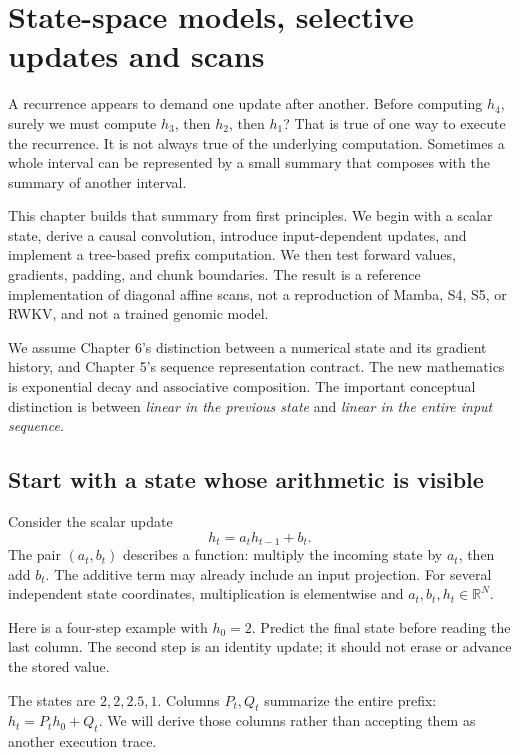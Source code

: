 \chapter{State-space models, selective updates and scans}

A recurrence appears to demand one update after another. Before computing
$h_4$, surely we must compute $h_3$, then $h_2$, then $h_1$?
That is true of one way to execute the recurrence. It is not always true
of the underlying computation. Sometimes a whole interval can be
represented by a small summary that composes with the summary of another
interval.

This chapter builds that summary from first principles. We begin with a
scalar state, derive a causal convolution, introduce input-dependent
updates, and implement a tree-based prefix computation. We then test
forward values, gradients, padding, and chunk boundaries. The result is
a reference implementation of diagonal affine scans, not a reproduction
of Mamba, S4, S5, or RWKV, and not a trained genomic model.

We assume Chapter 6's distinction between a numerical state and its
gradient history, and Chapter 5's sequence representation contract.
The new mathematics is exponential decay and associative composition.
The important conceptual distinction is between \emph{linear in the
previous state} and \emph{linear in the entire input sequence}.

\section{Start with a state whose arithmetic is visible}

Consider the scalar update
\begin{equation}
 h_t=a_t h_{t-1}+b_t.
 \label{eq:affine}
\end{equation}
The pair $(a_t,b_t)$ describes a function: multiply the incoming state
by $a_t$, then add $b_t$. The additive term may already include an
input projection. For several independent state coordinates, multiplication
is elementwise and $a_t,b_t,h_t\in\mathbb R^N$.

Here is a four-step example with $h_0=2$. Predict the final state before
reading the last column. The second step is an identity update; it
should not erase or advance the stored value.
\begin{center}\end{center}
The states are $2,2,2.5,1$. Columns $P_t,Q_t$ summarize the entire prefix:
$h_t=P_th_0+Q_t$. We will derive those columns rather than accepting
them as another execution trace.

